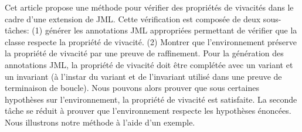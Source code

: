 


Cet article propose une méthode pour vérifier des propriétés de vivacités dans le cadre d'une extension de JML. Cette vérification est composée de deux sous-tâches: (1) générer les annotations JML appropriées permettant de vérifier que la classe respecte la propriété de vivacité. (2) Montrer que l'environnement préserve la propriété de vivacité par une preuve de raffinement. Pour la génération des annotations JML, la propriété de vivacité doit être complétée avec un variant et un invariant (à l'instar du variant et de l'invariant utilisé dans une preuve de terminaison de boucle). Nous pouvons alors prouver que sous certaines hypothèses sur l'environnement, la propriété de vivacité est satisfaite. La seconde tâche se réduit à prouver que l'environnement respecte les hypothèses énoncées. Nous illustrons notre méthode à l'aide d'un exemple. 